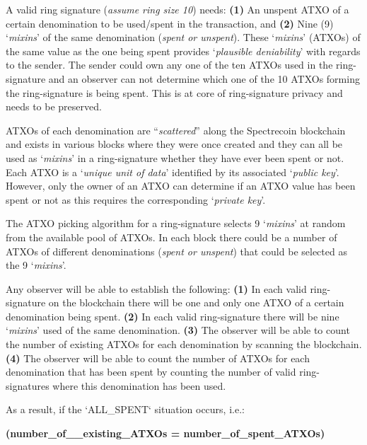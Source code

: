 A valid ring signature (\textit{assume ring size 10}) needs: \textbf{(1)} An
unspent ATXO of a certain denomination to be used/spent in the transaction,
and \textbf{(2)} Nine (9) ‘\textit{mixins}’ of the same denomination
(\textit{spent or unspent}). These ‘\textit{mixins}’ (ATXOs) of the same
value as the one being spent provides ‘\textit{plausible deniability}’ with
regards to the sender. The sender could own any one of the ten ATXOs used
in the ring-signature and an observer can not determine which one of the
10 ATXOs forming the ring-signature is being spent. This is at core of
ring-signature privacy and needs to be preserved.



ATXOs of each denomination are “\textit{scattered}” along the Spectrecoin
blockchain and exists in various blocks where they were once created and
they can all be used as ‘\textit{mixins}’ in a ring-signature whether they
have ever been spent or not. Each ATXO is a ‘\textit{unique unit of data}’
identified by its associated ‘\textit{public key}’. However, only the
owner of an ATXO can determine if an ATXO value has been spent or not
as this requires the corresponding ‘\textit{private key}’.



The ATXO picking algorithm for a ring-signature selects 9 ‘\textit{mixins}’
at random from the available pool of ATXOs. In each block there could be a
number of ATXOs of different denominations (\textit{spent or unspent})
that could be selected as the 9 ‘\textit{mixins}’.



Any observer will be able to establish the following: \textbf{(1)} In each
valid ring-signature on the blockchain there will be one and only one ATXO
of a certain denomination being spent. \textbf{(2)} In each valid
ring-signature there will be nine ‘\textit{mixins}’ used of the same
denomination. \textbf{(3)} The observer will be able to count the number
of existing ATXOs for each denomination by scanning the blockchain.
\textbf{(4)} The observer will be able to count the number of ATXOs for
each denomination that has been spent by counting the number of valid
ring-signatures where this denomination has been used.



As a result, if the ‘ALL\_SPENT‘ situation occurs, i.e.:



\textbf{(number\_of\_\_existing\_ATXOs = number\_of\_spent\_ATXOs) }



